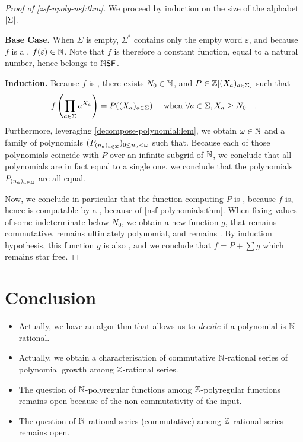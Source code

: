 \documentclass[sigconf,natbib=false,screen, review,anonymous]{acmart}
\begin{document}
\begin{proof}[Proof of \cref{zsf-npoly-nsf:thm}]
    We proceed by induction on the size of the alphabet $\card{\Sigma}$.

    \textbf{Base Case.} When $\Sigma$ is empty, $\Sigma^*$ contains
    only the empty word $\varepsilon$, and because $f$ is a
    , $f(\varepsilon) \in \mathbb{N}$.
    Note that $f$ is therefore a constant function, equal to a natural
    number, hence belongs to $\NSF$.

    
    \textbf{Induction.}
    Because $f$ is ,
    there exists $N_0 \in \mathbb{N}$, 
    and $P \in \mathbb{Z}[(X_a)_{a \in \Sigma}]$ 
    such that
    \begin{equation*}
        f\left( \prod_{a \in \Sigma} a^{X_a} \right)
        = 
        P((X_a)_{a \in \Sigma})
        \quad
        \text{ when }
        \forall a \in \Sigma, X_a \geq N_0
        \quad .
    \end{equation*}
    Furthermore, leveraging \cref{decompose-polynomial:lem},
    we obtain $\omega \in \mathbb{N}$
    and a family of polynomials 
    $(P_{(n_a)_{a \in \Sigma}})_{0 \leq n_a < \omega}$
    such that.
    Because each of those polynomials coincide with $P$ over an infinite
    subgrid of $\mathbb{N}$,
    we conclude that all polynomials are in fact equal to a single one.
    we conclude that the polynomials 
    $P_{(n_a)_{a \in \Sigma}}$ are all equal.

    Now, we conclude in particular that the function 
    computing $P$ is , because $f$ is,
    hence is computable by a ,
    because of \cref{nsf-polynomials:thm}.
    When fixing values of some indeterminate below $N_0$,
    we obtain a new function $g$, that remains commutative,
    remains ultimately polynomial, and remains .
    By induction hypothesis, this function $g$ is also 
    , and we conclude
    that 
    $f = P + \sum g$ which remains star free.
\end{proof}


\section{Conclusion}
\label{sec:ccl}

\begin{itemize}
    \item Actually, we have an algorithm that allows
        us to \emph{decide} if a polynomial is $\mathbb{N}$-rational.
    \item Actually, we obtain a characterisation of
        commutative 
        $\mathbb{N}$-rational series of polynomial growth
        among $\mathbb{Z}$-rational series.
    \item The question of $\mathbb{N}$-polyregular functions
        among $\mathbb{Z}$-polyregular functions remains open
        because of the non-commutativity of the input.
    \item The question of $\mathbb{N}$-rational series (commutative)
        among $\mathbb{Z}$-rational series remains open.
\end{itemize}
\end{document}

